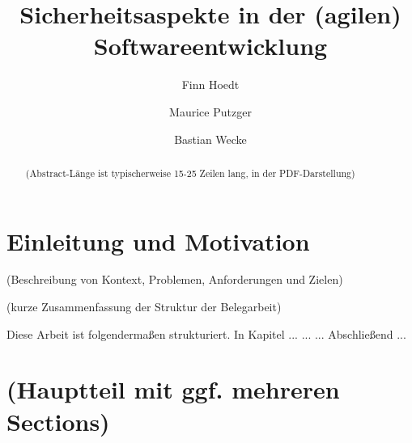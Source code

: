 \documentclass[acmtog]{acmart}
\begin{document}
\title{Sicherheitsaspekte in der (agilen) Softwareentwicklung}

\author{Finn Hoedt}
\author{Maurice Putzger}
\authornotemark[1]
\author{Bastian Wecke}
\authornotemark[1]
\renewcommand{\shortauthors}{Hoedt, Putzger und Wecke}

\begin{abstract}
  (Abstract-Länge ist typischerweise 15-25 Zeilen lang, in der PDF-Darstellung) 
  
  
\end{abstract}

\maketitle

\section{Einleitung und Motivation}

(Beschreibung von Kontext, Problemen, Anforderungen und Zielen) 



(kurze Zusammenfassung der Struktur der Belegarbeit)

Diese Arbeit ist folgendermaßen strukturiert. 
In Kapitel ... 
...
...
Abschließend ...



\section{(Hauptteil mit ggf. mehreren Sections)}
\end{document}
